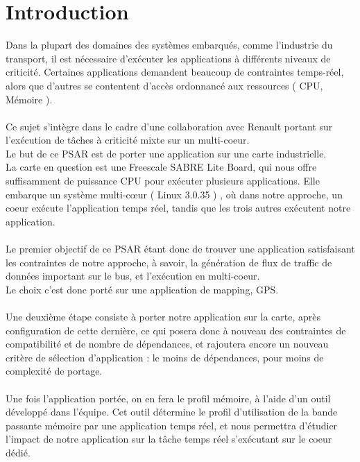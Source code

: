\section*{Introduction}

Dans la plupart des domaines des systèmes embarqués, comme l'industrie du transport, il est nécessaire d'exécuter les applications à différents niveaux de criticité. Certaines applications demandent beaucoup de contraintes temps-réel, alors que d'autres se contentent d'accès ordonnancé aux ressources ( CPU, Mémoire ).\\
\\
Ce sujet s'intègre dans le cadre d'une collaboration avec Renault portant sur l'exécution de tâches à criticité mixte sur un multi-coeur.\\
Le but de ce PSAR est de porter une application sur une carte industrielle.\\
La carte en question est une Freescale SABRE Lite Board, qui nous offre suffisamment de puissance CPU pour exécuter plusieurs applications. Elle embarque un système multi-cœur ( Linux 3.0.35 ) , où dans notre approche, un coeur exécute l'application temps réel, tandis que les trois autres exécutent notre application.\\
\\
Le premier objectif de ce PSAR étant donc de trouver une application satisfaisant les contraintes de notre approche, à savoir, la génération de flux de traffic de données important sur le bus, et l'exécution en multi-coeur.\\
Le choix c'est donc porté sur une application de mapping, GPS.\\
\\
Une deuxième étape consiste à porter notre application sur la carte, après configuration de cette dernière, ce qui posera donc à nouveau des contraintes de compatibilité et de nombre de dépendances, et rajoutera encore un nouveau critère de sélection d'application : le moins de dépendances, pour moins de complexité de portage.\\
\\
Une fois l'application portée, on en fera le profil mémoire, à l'aide d'un outil développé dans l'équipe. Cet outil détermine le profil d'utilisation de la bande passante mémoire par une application temps réel, et nous permettra d'étudier  l'impact de notre application sur la tâche temps réel s'exécutant sur le coeur dédié.\\
\\

\clearpage
